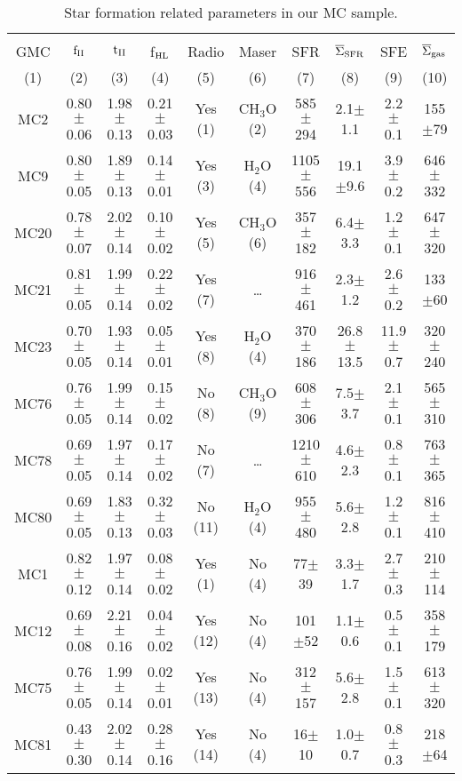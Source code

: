 \documentclass[iop]{emulateapj}
\begin{document}
\begin{table*}
\begin{center}
\centering 
\caption{Star formation related parameters in our MC sample. }
 \begin{tabular}{cccccccccc}
 \hline
 \hline
     &       &       &              &        &  &       &             &    &          \\
 GMC & $\rm f_{II}$ & $\rm t_{II}$ &f$_{\rm HL}$ & Radio  & Maser  &  SFR  &  $\overline\Sigma_{\rm SFR}$  &{SFE} &  $\overline\Sigma{\rm _{gas}}$\\
(1) & (2) & (3) & (4) & (5) & (6) &  (7) & (8) & (9) & (10) \\
 \hline
MC2  & 0.80$\pm$0.06  & 1.98$\pm$0.13  & 0.21$\pm$0.03  & Yes (1)  & CH$_3$O (2) & 585$\pm$294 & 2.1$\pm$1.1  &  2.2$\pm$0.1  & 155$\pm$79  \\             
MC9  & 0.80$\pm$0.05  & 1.89$\pm$0.13  & 0.14$\pm$0.01  & Yes (3)  & H$_2$O  (4)   & 1105$\pm$556 &19.1$\pm$9.6  &  3.9$\pm$0.2  & 646$\pm$332 \\
MC20 & 0.78$\pm$0.07  & 2.02$\pm$0.14 & 0.10$\pm$0.02  & Yes (5)  & CH$_3$O (6) & 357$\pm$182 & 6.4$\pm$3.3  &  1.2$\pm$0.1  & 647$\pm$320 \\
MC21 & 0.81$\pm$0.05  & 1.99$\pm$0.14  & 0.22$\pm$0.02  & Yes (7)  & \ldots              & 916$\pm$461 & 2.3$\pm$1.2  &  2.6$\pm$0.2  & 133$\pm$60  \\
MC23 & 0.70$\pm$0.05  & 1.93$\pm$0.14  & 0.05$\pm$0.01  & Yes (8)  & H$_2$O  (4)   & 370$\pm$186 & 26.8$\pm$13.5 & 11.9$\pm$0.7 & 320$\pm$240  \\
MC76 & 0.76$\pm$0.05  & 1.99$\pm$0.14  & 0.15$\pm$0.02  & No  (8)  & CH$_3$O (9) & 608$\pm$306 &  7.5$\pm$3.7 &  2.1$\pm$0.1  & 565$\pm$310 \\
MC78 & 0.69$\pm$0.05  & 1.97$\pm$0.14  & 0.17$\pm$0.02  & No  (7)  & \ldots              & 1210$\pm$610 & 4.6$\pm$2.3  &  0.8$\pm$0.1  & 763$\pm$365 \\
MC80 & 0.69$\pm$0.05  & 1.83$\pm$0.13  & 0.32$\pm$0.03  & No (11)  & H$_2$O  (4)  & 955$\pm$480 & 5.6$\pm$2.8  &  1.2$\pm$0.1  & 816$\pm$410 \\
  \hline
MC1  & 0.82$\pm$0.12  & 1.97$\pm$0.14   & 0.08$\pm$0.02  & Yes (1)    & No      (4)       & 77$\pm$39      & 3.3$\pm$1.7  &  2.7$\pm$0.3  & 210$\pm$114  \\
MC12 & 0.69$\pm$0.08 &  2.21$\pm$0.16  & 0.04$\pm$0.02  & Yes (12) & No      (4)       & 101$\pm$52   & 1.1$\pm$0.6  &  0.5$\pm$0.1  & 358$\pm$179 \\
MC75 & 0.76$\pm$0.05  & 1.99$\pm$0.14  & 0.02$\pm$0.01  & Yes (13) & No      (4)       & 312$\pm$157  & 5.6$\pm$2.8  &  1.5$\pm$0.1  & 613$\pm$320 \\
MC81 & 0.43$\pm$0.30  & 2.02$\pm$0.14  & 0.28$\pm$0.16  & Yes (14) & No      (4)        & 16$\pm$10     & 1.0$\pm$0.7  &  0.8$\pm$0.3  & 218$\pm$64  \\
\hline
 \end{tabular}


\end{center}
\end{table*}
\end{document}
